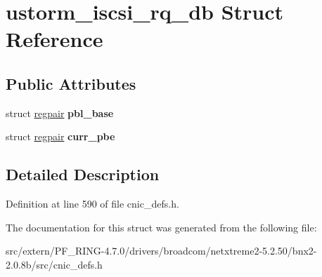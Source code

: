 \hypertarget{structustorm__iscsi__rq__db}{
\section{ustorm\_\-iscsi\_\-rq\_\-db Struct Reference}
\label{structustorm__iscsi__rq__db}
}
\subsection*{Public Attributes}
\begin{DoxyCompactItemize}
\item 
\hypertarget{structustorm__iscsi__rq__db_a431b07e527586320796547f721343b6b}{
struct \hyperlink{structregpair}{regpair} {\bfseries pbl\_\-base}}
\label{structustorm__iscsi__rq__db_a431b07e527586320796547f721343b6b}

\item 
\hypertarget{structustorm__iscsi__rq__db_abfe932fd9333374c22a81dbf6771909e}{
struct \hyperlink{structregpair}{regpair} {\bfseries curr\_\-pbe}}
\label{structustorm__iscsi__rq__db_abfe932fd9333374c22a81dbf6771909e}

\end{DoxyCompactItemize}


\subsection{Detailed Description}


Definition at line 590 of file cnic\_\-defs.h.



The documentation for this struct was generated from the following file:\begin{DoxyCompactItemize}
\item 
src/extern/PF\_\-RING-\/4.7.0/drivers/broadcom/netxtreme2-\/5.2.50/bnx2-\/2.0.8b/src/cnic\_\-defs.h\end{DoxyCompactItemize}
